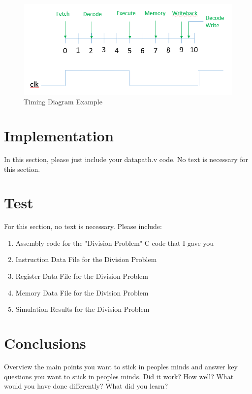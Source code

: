 \documentclass{article}
\begin{document}
\begin{figure}
	\caption{Timing Diagram Example}\label{fig:timing_diagram_example}
	\begin{center}
		\includegraphics[width=\textwidth]{../images/timing_diagram_example.png}
	\end{center}
\end{figure}

\section{Implementation}
In this section, please just include your datapath.v code.  No text is necessary for this section.

\section{Test}
For this section, no text is necessary.  Please include:
\begin{enumerate}
	\item Assembly code for the "Division Problem" C code that I gave you
	\item Instruction Data File for the Division Problem
	\item Register Data File for the Division Problem
	\item Memory Data File for the Division Problem
	\item Simulation Results for the Division Problem
\end{enumerate}

\section{Conclusions}
Overview the main points you want to stick in peoples minds and answer key questions you want to stick in peoples minds.  Did it work?  How well? What would you have done differently?  What did you learn?
\end{document}
